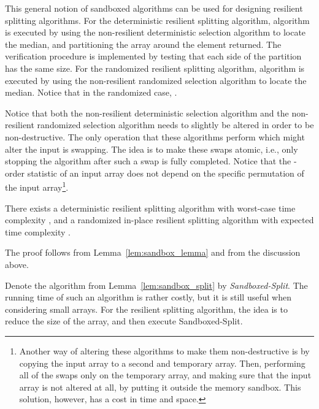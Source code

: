 \documentclass{llncs}
\begin{document}
This general notion of sandboxed algorithms can be used for designing resilient splitting algorithms. For the deterministic resilient splitting algorithm, algorithm  is executed by using the non-resilient deterministic selection algorithm to locate the median, and partitioning the array around the element returned. The verification procedure  is implemented by testing that each side of the partition has the same size. For the randomized resilient splitting algorithm, algorithm  is executed by using the non-resilient randomized selection algorithm to locate the median. Notice that in the randomized case, .

Notice that both the non-resilient deterministic selection algorithm and the non-resilient randomized selection algorithm needs to slightly be altered in order to be non-destructive. The only operation that these algorithms perform which might alter the input is swapping. The idea is to make these swaps atomic, i.e., only stopping the algorithm after such a swap is fully completed. Notice that the -order statistic of an input array does not depend on the specific permutation of the input array\footnote{Another way of altering these algorithms to make them non-destructive is by copying the input array to a second and temporary array. Then, performing all of the swaps only on the temporary array, and making sure that the input array is not altered at all, by putting it outside the memory sandbox. This solution, however, has a cost in time and space.}.

\begin{corollary}\label{lem:sandbox_split}
There exists a deterministic resilient splitting algorithm with worst-case time complexity , and a randomized in-place resilient splitting algorithm with expected time complexity .
\end{corollary}

\begin{pf}
The proof follows from Lemma~\ref{lem:sandbox_lemma} and from the discussion above.
\end{pf}


Denote the algorithm from Lemma~\ref{lem:sandbox_split} by \emph{Sandboxed-Split}. The running time of such an algorithm is rather costly, but it is still useful when considering small arrays. For the resilient splitting algorithm, the idea is to reduce the size of the array, and then execute Sandboxed-Split.
\end{document}
